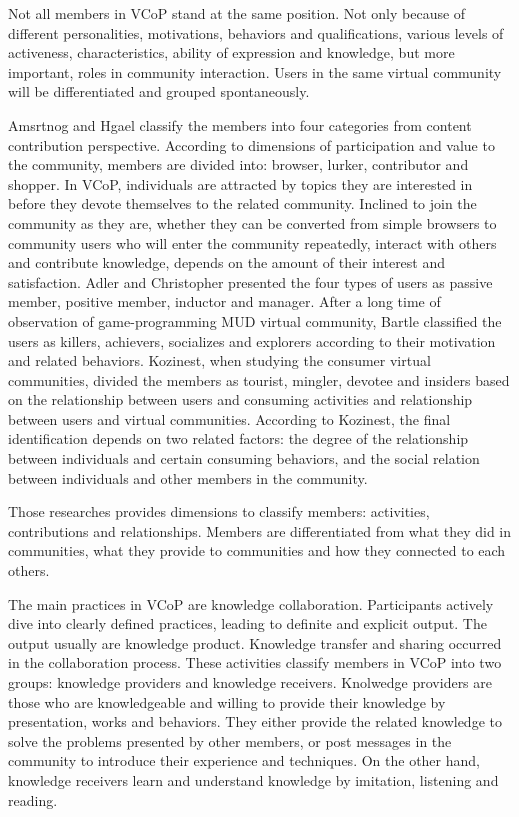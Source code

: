 \documentclass[doublespacing]{elsarticle}
\begin{document}
Not all members in VCoP stand at the same position. Not only because of  different personalities, motivations,
behaviors and qualifications, various levels of activeness,
characteristics, ability of expression and knowledge, but more important, roles in
community interaction. Users in the same virtual community will be
differentiated and grouped spontaneously. 

Amsrtnog and Hgael classify the members into four categories from
content contribution perspective.  According to dimensions of participation and value to
the community, members are divided  into:  browser, lurker, contributor and shopper\cite{hagel1997net}. In VCoP, individuals are attracted
by topics they are interested in before they devote themselves to the
related community. Inclined to join the community as they are, whether
they can be converted from simple browsers to community users who will
enter the community repeatedly, interact with others and contribute
knowledge, depends on the amount of their interest and
satisfaction. Adler and Christopher presented the four types of
users as passive member, positive member, inductor and
manager\cite{Christopher1998}. After a long time of observation of
game-programming MUD virtual community, Bartle classified the users as killers, achievers, socializes and explorers according to their motivation and related behaviors\cite{mud}. Kozinest, when studying the consumer virtual communities, divided the members as tourist, mingler, devotee and insiders based on the relationship between users and consuming activities and relationship between users and virtual communities\cite{Kozinets1999252}. According to Kozinest, the final identification depends on two related factors: the degree of the relationship between individuals and certain consuming behaviors, and the social relation between individuals and other members in the community. 


Those researches provides dimensions to classify members: activities,
contributions and relationships. Members are differentiated from what
they did in communities, what they provide to communities and how they connected to
each others.

The main practices in VCoP  are
knowledge collaboration.  Participants actively dive into
 clearly defined  practices, leading to definite and explicit
 output. The output
 usually are knowledge product.  Knowledge transfer and sharing occurred 
 in the collaboration process. These activities classify members in
 VCoP into two groups: knowledge providers and knowledge
 receivers. Knolwedge providers are those  who are knowledgeable and willing to
  provide their knowledge by presentation, works and behaviors. They
  either provide the related knowledge to solve the problems presented
  by other members, or post messages in the community to introduce
  their experience and techniques. On the other hand, knowledge receivers learn
  and understand knowledge by imitation, listening and
  reading.  
\end{document}
